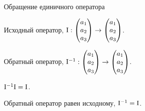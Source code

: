     
    


\begin{frame}{Обращение единичного оператора}

Исходный оператор, $\mathrm{I} : \begin{pmatrix}
  a_1 \\
  a_2 \\
  a_3 \\
\end{pmatrix} \to
\begin{pmatrix}
a_1 \\
a_2 \\
a_3 \\
\end{pmatrix}
$.
\pause

Обратный оператор,  
$\mathrm{I}^{-1} : \begin{pmatrix}
a_1 \\
a_2 \\
a_3 \\
    \end{pmatrix} \to
  \begin{pmatrix}
a_1 \\
a_2 \\
a_3 \\
    \end{pmatrix}
  $.
\pause

$\mathrm{I}^{-1} \mathrm{I} = \mathrm{I}$.
\pause

Обратный оператор равен исходному, $\mathrm{I}^{-1} = \mathrm{I}$.


\end{frame}
    





